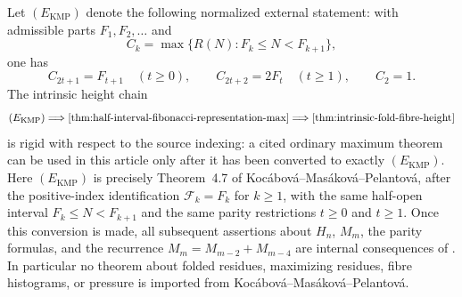 \begin{proposition}
\label{prop:kmp-indexing-lock-intrinsic-height}
\label{thm:intrinsic-height-kmp-index-lock}
Let \((E_{\mathrm{KMP}})\) denote the following normalized external statement:
with admissible parts \(F_1,F_2,\ldots\) and
\[
  C_k=\max\{R(N):F_k\le N<F_{k+1}\},
\]
one has
\[
  C_{2t+1}=F_{t+1}\quad(t\ge0),
  \qquad C_{2t+2}=2F_t\quad(t\ge1),
  \qquad C_2=1.
\]
The intrinsic height chain
\[
  (E_{\mathrm{KMP}})
  \Longrightarrow \Cref{thm:half-interval-fibonacci-representation-max}
  \Longrightarrow \Cref{thm:intrinsic-fold-fibre-height}
\]
is rigid with respect to the source indexing: a cited ordinary maximum theorem
can be used in this article only after it has been converted to exactly
\((E_{\mathrm{KMP}})\).  Here \((E_{\mathrm{KMP}})\) is precisely Theorem~4.7 of
Koc\'abov\'a--Mas\'akov\'a--Pelantov\'a, after the positive-index identification
\(\mathcal F_k=F_k\) for \(k\ge1\), with the same half-open interval
\(F_k\le N<F_{k+1}\) and the same parity restrictions \(t\ge0\) and \(t\ge1\).
Once this conversion is made, all subsequent assertions
about \(H_n\), \(M_m\), the parity formulas, and the recurrence
\(M_m=M_{m-2}+M_{m-4}\) are internal consequences of
.
In particular no theorem about folded residues, maximizing residues, fibre
histograms, or pressure is imported from
Koc\'abov\'a--Mas\'akov\'a--Pelantov\'a.
\end{proposition}

